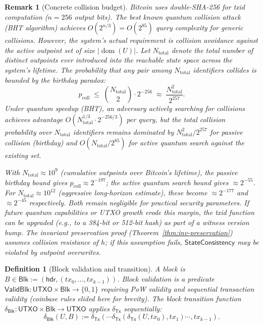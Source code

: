 \documentclass[11pt]{article}
\newtheorem{definition}{Definition}
\newtheorem{remark}{Remark}
\newcommand{\bits}{\{0,1\}}
\newcommand{\dom}{\operatorname{dom}}
\newcommand{\Tx}{\mathsf{Tx}}
\newcommand{\Blk}{\mathsf{Blk}}
\newcommand{\UTXO}{\mathsf{UTXO}}
\newcommand{\ValidBlk}{\mathsf{ValidBlk}}
\newcommand{\DeltaTx}{\delta_{\Tx}}
\newcommand{\DeltaBlk}{\delta_{\Blk}}
\begin{document}
\begin{remark}[Concrete collision budget]\label{rem:collision-budget}
Bitcoin uses double-SHA-256 for txid computation ($n=256$ output bits).
The best known quantum collision attack (BHT algorithm) achieves $O(2^{n/3})=O(2^{85})$ query complexity for generic collisions.
However, the system's actual requirement is collision avoidance against the active outpoint set of size $|\dom(U)|$.
Let $N_{\mathrm{total}}$ denote the total number of distinct outpoints ever introduced into the reachable state space across the system's lifetime.
The probability that any pair among $N_{\mathrm{total}}$ identifiers collides is bounded by the birthday paradox:
\[
p_{\mathrm{coll}} \;\le\; \binom{N_{\mathrm{total}}}{2}\cdot 2^{-256} \;\approx\; \frac{N_{\mathrm{total}}^2}{2^{257}}.
\]
Under quantum speedup (BHT), an adversary actively searching for collisions achieves advantage $O(N_{\mathrm{total}}^{1/3}\cdot 2^{-256/3})$ per query, but the total collision probability over $N_{\mathrm{total}}$ identifiers remains dominated by $N_{\mathrm{total}}^2/2^{257}$ for passive collision (birthday) and $O(N_{\mathrm{total}}/2^{85})$ for active quantum search against the existing set.

With $N_{\mathrm{total}}\approx 10^9$ (cumulative outpoints over Bitcoin's lifetime), the passive birthday bound gives $p_{\mathrm{coll}}\approx 2^{-197}$; the active quantum search bound gives $\approx 2^{-55}$.
For $N_{\mathrm{total}}\approx 10^{12}$ (aggressive long-horizon estimate), these become $\approx 2^{-177}$ and $\approx 2^{-45}$ respectively.
Both remain negligible for practical security parameters.
If future quantum capabilities or UTXO growth erode this margin, the txid function can be upgraded (e.g., to a 384-bit or 512-bit hash) as part of a witness version bump.
The invariant preservation proof (Theorem~\ref{thm:inv-preservation}) assumes collision resistance of $h$; if this assumption fails, $\textsf{StateConsistency}$ may be violated by outpoint overwrites.
\end{remark}

\begin{definition}[Block validation and transition]
A block is $B\in\Blk:=(\textsf{hdr},(tx_0,\dots,tx_{k-1}))$.
Block validation is a predicate $\ValidBlk:\UTXO\times\Blk\to\bits$ requiring PoW validity and sequential transaction validity (coinbase rules elided here for brevity).
The block transition function $\DeltaBlk:\UTXO\times\Blk\to\UTXO$ applies $\DeltaTx$ sequentially:
\[
\DeltaBlk(U,B) := \DeltaTx(\cdots\DeltaTx(\DeltaTx(U,tx_0),tx_1)\cdots,tx_{k-1}).
\]
\end{definition}
\end{document}
